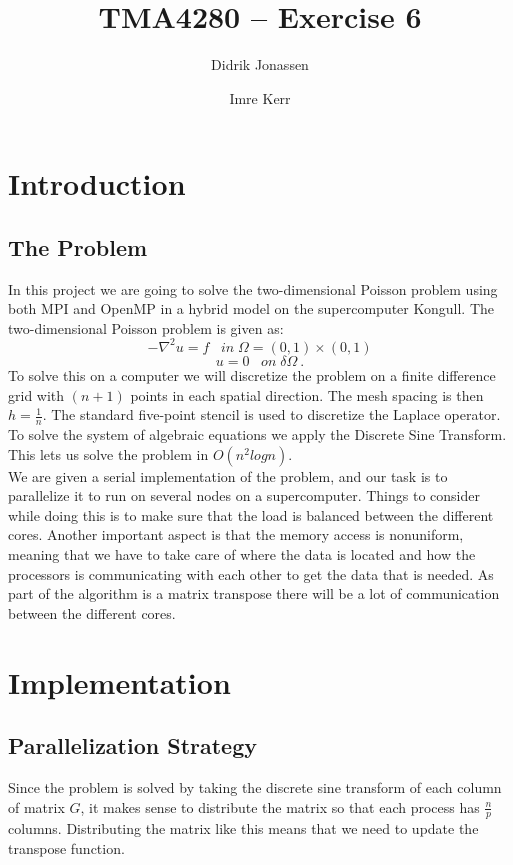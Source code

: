 \documentclass[a4paper, 12pt]{article}
\title{TMA4280 -- Exercise 6}
\author{Didrik Jonassen \and Imre Kerr}
\begin{document}
\maketitle

\section{Introduction}
    \subsection{The Problem}
    In this project we are going to solve the two-dimensional Poisson problem using both MPI and OpenMP in a hybrid model on the supercomputer Kongull. The two-dimensional Poisson problem is given as:
    $$-\nabla^2u = f \;\;\; in \; \Omega = (0,1) \times (0,1)$$
    $$u = 0 \;\;\; on \; \delta\Omega\:.$$
    To solve this on a computer we will discretize the problem on a finite difference grid with $(n+1)$ points in each spatial direction. The mesh spacing is then $h = \frac{1}{n}$. The standard five-point stencil is used to discretize the Laplace operator.\\
    To solve the system of algebraic equations we apply the Discrete Sine Transform. This lets us solve the problem in $O(n^2log\textit{n})$.\\
    We are given a serial implementation of the problem, and our task is to parallelize it to run on several nodes on a supercomputer. Things to consider while doing this is to make sure that the load is balanced between the different cores. Another important aspect is that the memory access is nonuniform, meaning that we have to take care of where the data is located and how the processors is communicating with each other to get the data that is needed. As part of the algorithm is a matrix transpose there will be a lot of communication between the different cores.
    
\section{Implementation}
    \subsection{Parallelization Strategy}
    Since the problem is solved by taking the discrete sine transform of each column of matrix $G$, it makes sense to distribute the matrix so that each process has $\frac{n}{p}$ columns. Distributing the matrix like this means that we need to update the transpose function.
    
\end{document}
